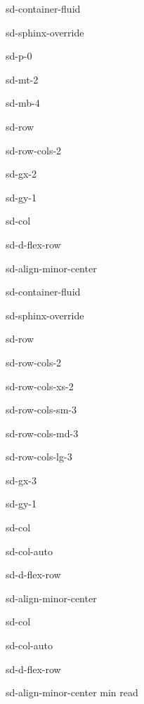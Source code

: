 \documentclass[letterpaper,10pt,italian]{jupyterBook}
\begin{document}
\begin{sphinxuseclass}{sd-container-fluid}
\begin{sphinxuseclass}{sd-sphinx-override}
\begin{sphinxuseclass}{sd-p-0}
\begin{sphinxuseclass}{sd-mt-2}
\begin{sphinxuseclass}{sd-mb-4}
\begin{sphinxuseclass}{sd-row}
\begin{sphinxuseclass}{sd-row-cols-2}
\begin{sphinxuseclass}{sd-gx-2}
\begin{sphinxuseclass}{sd-gy-1}
\begin{sphinxuseclass}{sd-col}
\begin{sphinxuseclass}{sd-d-flex-row}
\begin{sphinxuseclass}{sd-align-minor-center}
\begin{sphinxuseclass}{sd-container-fluid}
\begin{sphinxuseclass}{sd-sphinx-override}
\begin{sphinxuseclass}{sd-row}
\begin{sphinxuseclass}{sd-row-cols-2}
\begin{sphinxuseclass}{sd-row-cols-xs-2}
\begin{sphinxuseclass}{sd-row-cols-sm-3}
\begin{sphinxuseclass}{sd-row-cols-md-3}
\begin{sphinxuseclass}{sd-row-cols-lg-3}
\begin{sphinxuseclass}{sd-gx-3}
\begin{sphinxuseclass}{sd-gy-1}
\begin{sphinxuseclass}{sd-col}
\begin{sphinxuseclass}{sd-col-auto}
\begin{sphinxuseclass}{sd-d-flex-row}
\begin{sphinxuseclass}{sd-align-minor-center}
\end{sphinxuseclass}
\end{sphinxuseclass}
\end{sphinxuseclass}
\end{sphinxuseclass}
\begin{sphinxuseclass}{sd-col}
\begin{sphinxuseclass}{sd-col-auto}
\begin{sphinxuseclass}{sd-d-flex-row}
\begin{sphinxuseclass}{sd-align-minor-center}
 min read

\end{sphinxuseclass}
\end{sphinxuseclass}
\end{sphinxuseclass}
\end{sphinxuseclass}
\end{sphinxuseclass}
\end{sphinxuseclass}
\end{sphinxuseclass}
\end{sphinxuseclass}
\end{sphinxuseclass}
\end{sphinxuseclass}
\end{sphinxuseclass}
\end{sphinxuseclass}
\end{sphinxuseclass}
\end{sphinxuseclass}
\end{sphinxuseclass}
\end{sphinxuseclass}
\end{sphinxuseclass}
\end{sphinxuseclass}
\end{sphinxuseclass}
\end{sphinxuseclass}
\end{sphinxuseclass}
\end{sphinxuseclass}
\end{sphinxuseclass}
\end{sphinxuseclass}
\end{sphinxuseclass}
\end{sphinxuseclass}
\end{document}
